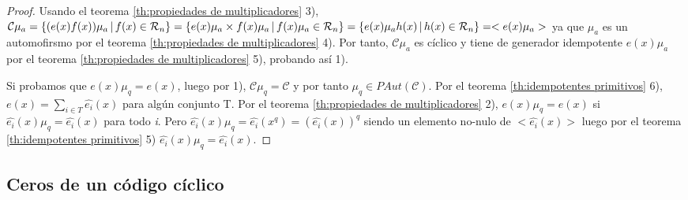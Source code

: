 \begin{proof}
Usando el teorema \ref{th:propiedades de multiplicadores} 3), $\mathcal{C}\mu_a = \{ (e(x)f(x))\mu_a \thinspace | \thinspace f(x) \in \mathcal{R}_n \} = \{ e(x)\mu_a \times f(x)\mu_a \thinspace | \thinspace f(x)\mu_a \in \mathcal{R}_n \} = \{ e(x)\mu_ah(x) \thinspace | \thinspace h(x) \in \mathcal{R}_n \} = <e(x)\mu_a> $ ya que $\mu_a$ es un automofirsmo por el teorema \ref{th:propiedades de multiplicadores} 4). Por tanto, $\mathcal{C}\mu_a$ es cíclico y tiene de generador idempotente $e(x)\mu_a$ por el teorema \ref{th:propiedades de multiplicadores} 5), probando así 1).

Si probamos que $e(x)\mu_q = e(x)$, luego por 1), $\mathcal{C}\mu_q = \mathcal{C}$ y por tanto $\mu_q \in PAut(\mathcal{C})$. Por el teorema \ref{th:idempotentes primitivos} 6), $e(x) = \sum_{i \in T} \widehat{e_i}(x) $ para algún conjunto T. Por el teorema \ref{th:propiedades de multiplicadores} 2), $e(x)\mu_q = e(x)$ si $\widehat{e_i}(x)\mu_q = \widehat{e_i}(x)$ para todo \textit{i}. Pero $\widehat{e_i}(x)\mu_q = \widehat{e_i}(x^q) = (\widehat{e_i}(x))^q$ siendo un elemento no-nulo de $<\widehat{e_i}(x)>$ luego por el teorema \ref{th:idempotentes primitivos} 5) $\widehat{e_i}(x)\mu_q  = \widehat{e_i}(x)$.
\end{proof}

\subsection{Ceros de un código cíclico}